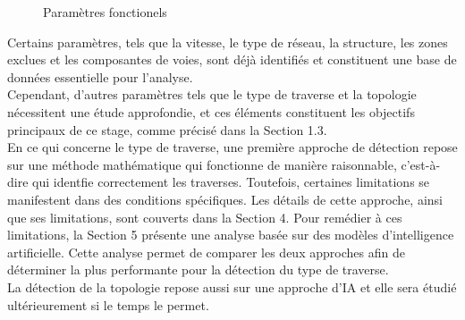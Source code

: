 \begin{figure}[H]
            \centering
            \caption{Paramètres fonctionels } 
        \end{figure}


\noindent Certains paramètres, tels que la vitesse, le type de réseau, la structure, les zones exclues et les composantes de voies, sont déjà identifiés et constituent une base de données essentielle pour l'analyse. \\


\noindent Cependant, d'autres paramètres tels que le type de traverse et la topologie nécessitent une étude approfondie, et ces éléments constituent les objectifs principaux de ce stage, comme précisé dans la Section 1.3. \\


\noindent En ce qui concerne le type de traverse, une première approche de détection repose sur une méthode mathématique qui fonctionne de manière raisonnable, c'est-à-dire qui identfie correctement les traverses. Toutefois, certaines limitations se manifestent dans des conditions spécifiques. Les détails de cette approche, ainsi que ses limitations, sont couverts dans la Section 4. Pour remédier à ces limitations, la Section 5 présente une analyse basée sur des modèles d'intelligence artificielle. Cette analyse permet de comparer les deux approches afin de déterminer la plus performante  pour la détection du type de traverse. \\

 \noindent La détection de la topologie repose aussi sur une approche d'IA et elle sera étudié ultérieurement si le temps le permet. 


